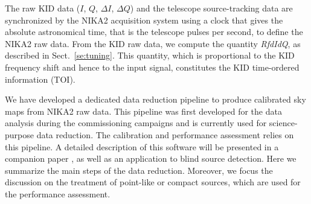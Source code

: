 

The raw KID data ($I$, $Q$, $\Delta I$, $\Delta Q$) and the telescope
source-tracking data are synchronized by the NIKA2 acquisition system using a
clock that gives the absolute astronomical time, that is the telescope
pulses per second, to define the NIKA2 raw data. From the KID raw
data, we compute the quantity \emph{RfdIdQ}, as described in
Sect.~\ref{se:tuning}. This quantity, which is proportional to the KID
frequency shift and hence to the input signal, constitutes the
KID time-ordered information (TOI).


We have developed a dedicated data reduction pipeline to
produce calibrated sky maps from NIKA2 raw data. This pipeline was first 
developed for the data analysis during the commissioning campaigns and
is currently used for science-purpose data reduction. The calibration
and performance assessment relies on this pipeline. 
A detailed description of this software will be presented in a companion
paper \citep{Ponthieu2019}, as well as an application to blind source
detection. Here we summarize the main steps of the data
reduction. {\lp Moreover, we focus the discussion on the treatment of
point-like or compact sources, which are used for the
performance assessment.}

